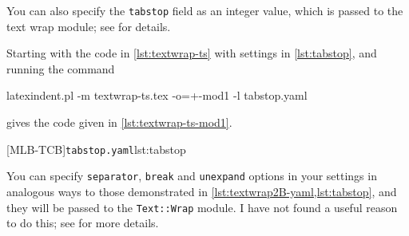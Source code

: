  You can also specify the \texttt{tabstop} field  as an integer value, which is passed to the text wrap module; see
 \cite{textwrap} for details.

 \begin{example}
 Starting with the code in \cref{lst:textwrap-ts} with settings in \cref{lst:tabstop},
 and running the command   %

 \begin{commandshell}
	 latexindent.pl -m textwrap-ts.tex -o=+-mod1 -l tabstop.yaml
	 \end{commandshell}

 gives the code given in \cref{lst:textwrap-ts-mod1}.
 \begin{cmhtcbraster}[raster columns=3,
   raster left skip=-3.5cm,
   raster right skip=-2cm,
   raster column skip=.03\linewidth]
  [MLB-TCB]{\texttt{tabstop.yaml}}{lst:tabstop}
 \end{cmhtcbraster}
 \end{example}

 You can specify \texttt{separator}, \texttt{break} and \texttt{unexpand} options in your
 settings in analogous ways to those demonstrated in
 \cref{lst:textwrap2B-yaml,lst:tabstop}, and they will be passed to the
 \texttt{Text::Wrap} module. I have not found a useful reason to do this; see
 \cite{textwrap} for more details.

